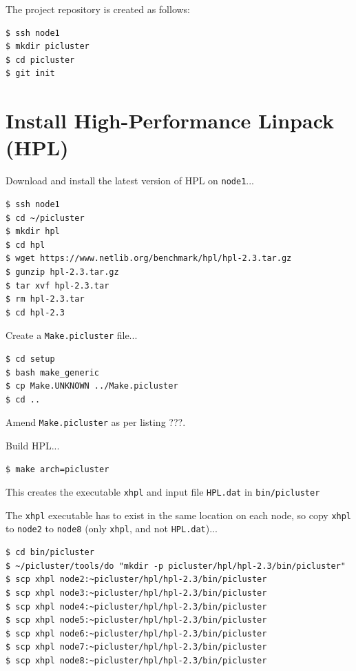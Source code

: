 \documentclass{report}
\begin{document}
The project repository is created as follows:

\lstset{style=type}
\begin{lstlisting}[]
$ ssh node1
$ mkdir picluster
$ cd picluster
$ git init
\end{lstlisting}



%
%
\chapter{Install High-Performance Linpack (HPL)}

Download and install the latest version of HPL on \verb|node1|...

\lstset{style=type}
\begin{lstlisting}
$ ssh node1
$ cd ~/picluster
$ mkdir hpl
$ cd hpl
$ wget https://www.netlib.org/benchmark/hpl/hpl-2.3.tar.gz
$ gunzip hpl-2.3.tar.gz
$ tar xvf hpl-2.3.tar
$ rm hpl-2.3.tar
$ cd hpl-2.3
\end{lstlisting}

Create a \verb|Make.picluster| file...

\lstset{style=type}
\begin{lstlisting}
$ cd setup
$ bash make_generic
$ cp Make.UNKNOWN ../Make.picluster
$ cd ..
\end{lstlisting}

Amend \verb|Make.picluster| as per listing ???.

\lstset{style=listing}


Build HPL...

\lstset{style=type}
\begin{lstlisting}
$ make arch=picluster   
\end{lstlisting}

This creates the executable \verb|xhpl| and input file \verb|HPL.dat| in \verb|bin/picluster|

The \verb|xhpl| executable has to exist in the same location on each node, so copy \verb|xhpl| to \verb|node2| to \verb|node8| (only \verb|xhpl|, and not \verb|HPL.dat|)...

\lstset{style=type}
\begin{lstlisting}
$ cd bin/picluster
$ ~/picluster/tools/do "mkdir -p picluster/hpl/hpl-2.3/bin/picluster"
$ scp xhpl node2:~picluster/hpl/hpl-2.3/bin/picluster
$ scp xhpl node3:~picluster/hpl/hpl-2.3/bin/picluster
$ scp xhpl node4:~picluster/hpl/hpl-2.3/bin/picluster
$ scp xhpl node5:~picluster/hpl/hpl-2.3/bin/picluster
$ scp xhpl node6:~picluster/hpl/hpl-2.3/bin/picluster
$ scp xhpl node7:~picluster/hpl/hpl-2.3/bin/picluster
$ scp xhpl node8:~picluster/hpl/hpl-2.3/bin/picluster
\end{lstlisting}
\end{document}
